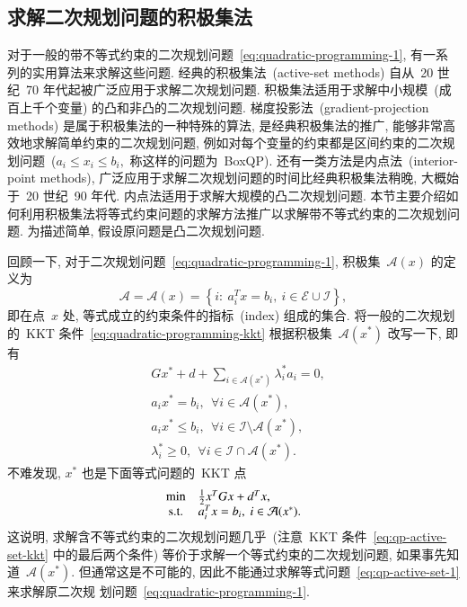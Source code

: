 \subsection{求解二次规划问题的积极集法}
\label{subsec:7.2.2}

对于一般的带不等式约束的二次规划问题~\eqref{eq:quadratic-programming-1}, 有一系列的实用算法来求解这些问题. 经典的积极集法~(active-set methods) 自从~20 世纪~70 年代起被广泛应用于求解二次规划问题. 积极集法适用于求解中小规模~(成百上千个变量) 的凸和非凸的二次规划问题. 梯度投影法~(gradient-projection methods) 是属于积极集法的一种特殊的算法, 是经典积极集法的推广, 能够非常高效地求解简单约束的二次规划问题, 例如对每个变量的约束都是区间约束的二次规划问题~($a_i \leqslant x_i \leqslant b_i,$ 称这样的问题为~BoxQP). 还有一类方法是内点法~(interior-point methods), 广泛应用于求解二次规划问题的时间比经典积极集法稍晚, 大概始于~20 世纪~90 年代. 内点法适用于求解大规模的凸二次规划问题. 本节主要介绍如何利用积极集法将等式约束问题的求解方法推广以求解带不等式约束的二次规划问题. 为描述简单, 假设原问题是凸二次规划问题.

回顾一下, 对于二次规划问题~\eqref{eq:quadratic-programming-1}, 积极集~$\mathcal{A}(x)$ 的定义为
\begin{equation}
\label{eq:qp-active-set}
\mathcal{A} = \mathcal{A}({x}) = \left\{ i : ~ {a}_i^T {x} = b_i, ~ i \in \mathcal{E} \cup \mathcal{I} \right\},
\end{equation}
即在点~${x}$ 处, 等式成立的约束条件的指标~(index) 组成的集合. 
将一般的二次规划的~KKT 条件~\eqref{eq:quadratic-programming-kkt} 根据积极集~$\mathcal{A}({x}^*)$ 改写一下, 即有
\begin{equation}
\label{eq:qp-active-set-kkt}
\begin{aligned}
& G {x}^* + d + \sum\limits_{i \in \mathcal{A}({x}^*)} \lambda_i^* {a}_i = {0}, \\
& {a}_i {x}^* = b_i, ~~ \forall i \in \mathcal{A}({x}^*), \\
& {a}_i {x}^* \leqslant b_i, ~~ \forall i \in \mathcal{I} \setminus \mathcal{A}({x}^*), \\
& \lambda_i^* \geqslant 0, ~~ \forall i \in \mathcal{I} \cap \mathcal{A}({x}^*).
\end{aligned}
\end{equation}
不难发现, ${x}^*$ 也是下面等式问题的~KKT 点
\begin{equation}
\label{eq:qp-active-set-1}
\begin{array}{cl}
\min & \frac{1}{2} {x}^T G {x} + {d}^T {x}, \\
{\rm s.t.} & {a}_i^T {x} = b_i, ~ i \in \mathcal{A}({x}^*).
\end{array}
\end{equation}
这说明, 求解含不等式约束的二次规划问题几乎~(注意~KKT 条件~\eqref{eq:qp-active-set-kkt} 中的最后两个条件) 等价于求解一个等式约束的二次规划问题, 如果事先知道~$\mathcal{A}({x}^*).$ 但通常这是不可能的, 因此不能通过求解等式问题~\eqref{eq:qp-active-set-1} 来求解原二次规
划问题~\eqref{eq:quadratic-programming-1}.

